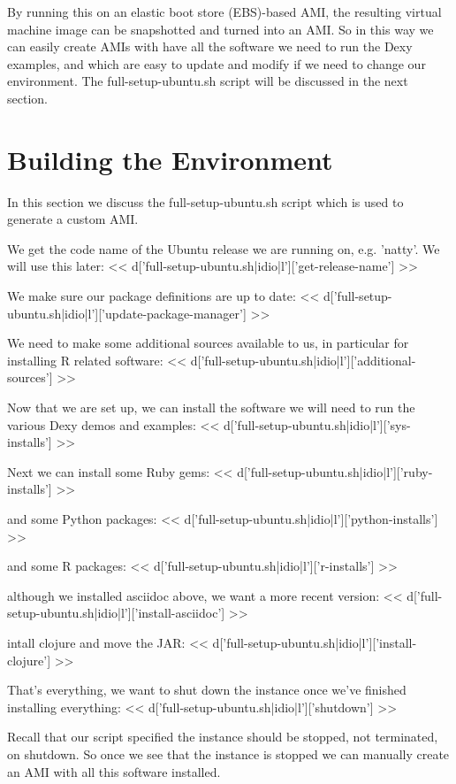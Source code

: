 \documentclass{tufte-handout}
\begin{document}
By running this on an elastic boot store (EBS)-based AMI, the resulting virtual machine image can be snapshotted and turned into an AMI. So in this way we can easily create AMIs with have all the software we need to run the Dexy examples, and which are easy to update and modify if we need to change our environment. The full-setup-ubuntu.sh script will be discussed in the next section.

\section{Building the Environment}

In this section we discuss the full-setup-ubuntu.sh script which is used to generate a custom AMI.

We get the code name of the Ubuntu release we are running on, e.g. 'natty'. We will use this later:
<< d['full-setup-ubuntu.sh|idio|l']['get-release-name'] >>

We make sure our package definitions are up to date:
<< d['full-setup-ubuntu.sh|idio|l']['update-package-manager'] >>

We need to make some additional sources available to us, in particular for installing R related software:
<< d['full-setup-ubuntu.sh|idio|l']['additional-sources'] >>

Now that we are set up, we can install the software we will need to run the various Dexy demos and examples:
<< d['full-setup-ubuntu.sh|idio|l']['sys-installs'] >>

Next we can install some Ruby gems:
<< d['full-setup-ubuntu.sh|idio|l']['ruby-installs'] >>

and some Python packages:
<< d['full-setup-ubuntu.sh|idio|l']['python-installs'] >>

and some R packages:
<< d['full-setup-ubuntu.sh|idio|l']['r-installs'] >>

although we installed asciidoc above, we want a more recent version:
<< d['full-setup-ubuntu.sh|idio|l']['install-asciidoc'] >>

intall clojure and move the JAR:
<< d['full-setup-ubuntu.sh|idio|l']['install-clojure'] >>

That's everything, we want to shut down the instance once we've finished installing everything:
<< d['full-setup-ubuntu.sh|idio|l']['shutdown'] >>

Recall that our script specified the instance should be stopped, not terminated, on shutdown. So once we see that the instance is stopped we can manually create an AMI with all this software installed.
\end{document}
